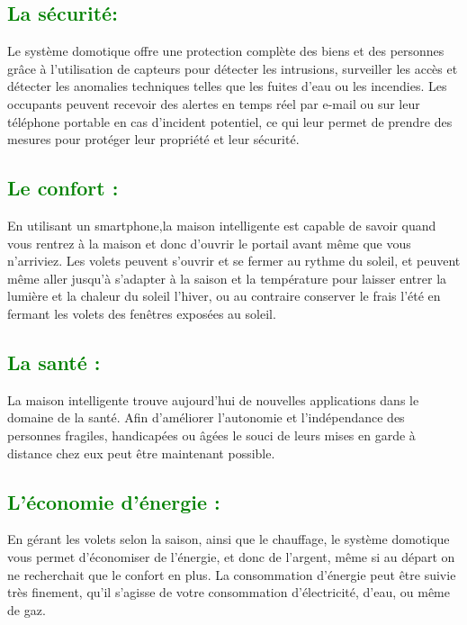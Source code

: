 \begin{flushleft}
 	\subsection{\textcolor{green}{La sécurité:}}
 	Le système domotique offre une protection complète des biens et des personnes grâce à l'utilisation de capteurs pour détecter les intrusions, surveiller les accès et détecter les anomalies techniques telles que les fuites d'eau ou les incendies. Les occupants peuvent recevoir des alertes en temps réel par e-mail ou sur leur téléphone portable en cas d'incident potentiel, ce qui leur permet de prendre des mesures pour protéger leur propriété et leur sécurité.
 	\subsection{\textcolor{green}{Le confort :}}
 	En utilisant un smartphone,la maison intelligente est
 	capable de savoir quand vous rentrez à la maison et donc d’ouvrir le
 	portail avant même que vous n’arriviez. Les volets peuvent s’ouvrir et
 	se fermer au rythme du soleil, et peuvent même aller jusqu’à
 	s’adapter à la saison et la température pour laisser entrer la lumière et
 	la chaleur du soleil l’hiver, ou au contraire conserver le frais l’été en
 	fermant les volets des fenêtres exposées au soleil.
 	\subsection{\textcolor{green}{La santé :}}
 	La maison intelligente trouve aujourd’hui de nouvelles applications dans le
 	domaine de la santé. Afin d’améliorer l’autonomie et l’indépendance
 	des personnes fragiles, handicapées ou âgées le souci de leurs mises
 	en garde à distance chez eux peut être maintenant possible.
 	\subsection{\textcolor{green}{L’économie d’énergie :}}
 	En gérant les volets selon la saison, ainsi que le chauffage, le système
 	domotique vous permet d’économiser de l’énergie, et donc de
 	l’argent, même si au départ on ne recherchait que le confort en plus.
 	La consommation d’énergie peut être suivie très finement, qu’il
 	s’agisse de votre consommation d’électricité, d’eau, ou même de gaz.

\end{flushleft}
